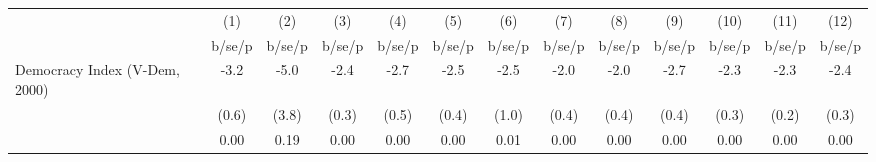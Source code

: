 \begin{tabular}{l*{12}{c}}
\hline\hline
                    &\multicolumn{1}{c}{(1)}&\multicolumn{1}{c}{(2)}&\multicolumn{1}{c}{(3)}&\multicolumn{1}{c}{(4)}&\multicolumn{1}{c}{(5)}&\multicolumn{1}{c}{(6)}&\multicolumn{1}{c}{(7)}&\multicolumn{1}{c}{(8)}&\multicolumn{1}{c}{(9)}&\multicolumn{1}{c}{(10)}&\multicolumn{1}{c}{(11)}&\multicolumn{1}{c}{(12)}\\
                    &      b/se/p&      b/se/p&      b/se/p&      b/se/p&      b/se/p&      b/se/p&      b/se/p&      b/se/p&      b/se/p&      b/se/p&      b/se/p&      b/se/p\\
\hline
Democracy Index (V-Dem, 2000)&        -3.2&        -5.0&        -2.4&        -2.7&        -2.5&        -2.5&        -2.0&        -2.0&        -2.7&        -2.3&        -2.3&        -2.4\\
                    &       (0.6)&       (3.8)&       (0.3)&       (0.5)&       (0.4)&       (1.0)&       (0.4)&       (0.4)&       (0.4)&       (0.3)&       (0.2)&       (0.3)\\
                    &        0.00&        0.19&        0.00&        0.00&        0.00&        0.01&        0.00&        0.00&        0.00&        0.00&        0.00&        0.00\\
\hline\hline
\end{tabular}
